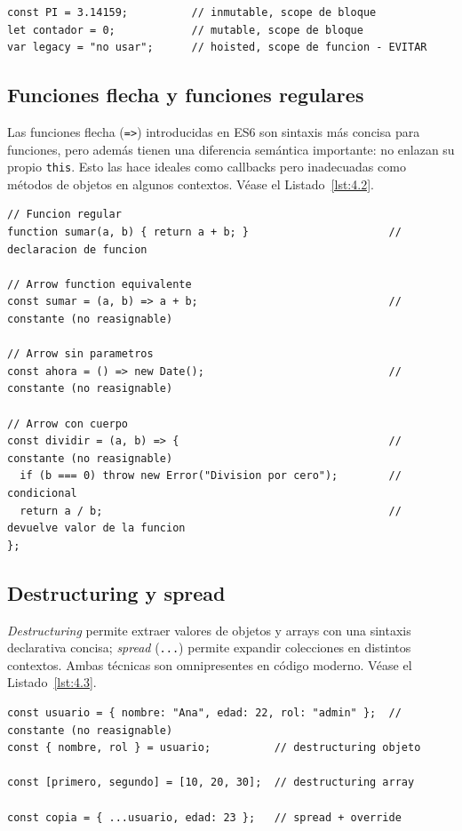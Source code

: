 \documentclass[11pt,a4paper,openany]{book}
\begin{document}
\begin{lstlisting}[style=js,numbers=none,caption={Ejemplo de JavaScript},label=lst:4.1]
const PI = 3.14159;          // inmutable, scope de bloque
let contador = 0;            // mutable, scope de bloque
var legacy = "no usar";      // hoisted, scope de funcion - EVITAR
\end{lstlisting}

\subsection{Funciones flecha y funciones regulares}

Las funciones flecha (\texttt{=>}) introducidas en ES6 son
sintaxis más concisa para funciones, pero además tienen una
diferencia semántica importante: no enlazan su propio
\texttt{this}. Esto las hace ideales como callbacks pero
inadecuadas como métodos de objetos en algunos contextos. V\'ease el Listado~\ref{lst:4.2}.


\begin{lstlisting}[style=js,numbers=none,caption={Ejemplo de JavaScript},label=lst:4.2]
// Funcion regular
function sumar(a, b) { return a + b; }                      // declaracion de funcion

// Arrow function equivalente
const sumar = (a, b) => a + b;                              // constante (no reasignable)

// Arrow sin parametros
const ahora = () => new Date();                             // constante (no reasignable)

// Arrow con cuerpo
const dividir = (a, b) => {                                 // constante (no reasignable)
  if (b === 0) throw new Error("Division por cero");        // condicional
  return a / b;                                             // devuelve valor de la funcion
};
\end{lstlisting}

\subsection{Destructuring y spread}

\emph{Destructuring} permite extraer valores de objetos y
arrays con una sintaxis declarativa concisa; \emph{spread}
(\texttt{...}) permite expandir colecciones en distintos
contextos. Ambas técnicas son omnipresentes en código moderno. V\'ease el Listado~\ref{lst:4.3}.


\begin{lstlisting}[style=js,numbers=none,caption={Ejemplo de JavaScript},label=lst:4.3]
const usuario = { nombre: "Ana", edad: 22, rol: "admin" };  // constante (no reasignable)
const { nombre, rol } = usuario;          // destructuring objeto

const [primero, segundo] = [10, 20, 30];  // destructuring array

const copia = { ...usuario, edad: 23 };   // spread + override
\end{lstlisting}
\end{document}
